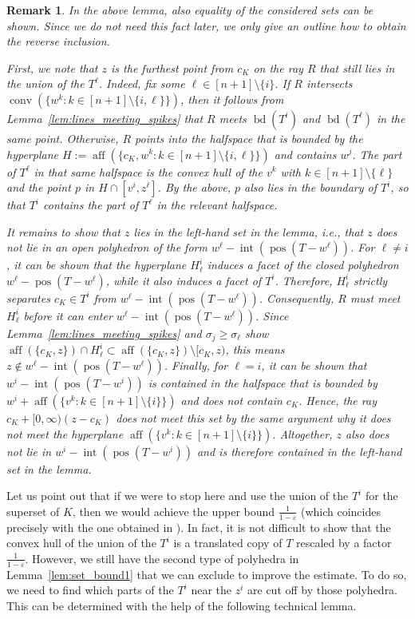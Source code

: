 \documentclass{amsart}
\newtheorem{remark}[theorem]{Remark}
\DeclareMathOperator{\conv}{conv}
\DeclareMathOperator{\pos}{pos}
\DeclareMathOperator{\aff}{aff}
\DeclareMathOperator{\inte}{int}
\DeclareMathOperator{\bd}{bd}
\begin{document}
\begin{remark}\label{rem:exact_Ti_description}
In the above lemma, also equality of the considered sets can be shown.
Since we do not need this fact later, we only give an outline how to obtain the reverse inclusion.

First, we note that $z$ is the furthest point from $c_K$ on the ray $R$ that still lies in the union of the $T^\ell$.
Indeed, fix some $\ell \in [n+1] \setminus \{i\}$.
If $R$ intersects $\conv(\{ w^k : k \in [n+1] \setminus \{i,\ell\} \})$, then it follows from Lemma~\ref{lem:lines_meeting_spikes} that $R$ meets $\bd(T^i)$ and $\bd(T^\ell)$ in the same point.
Otherwise, $R$ points into the halfspace that is bounded by the hyperplane $H := \aff(\{c_K, w^k : k \in [n+1] \setminus \{i,\ell\} \})$ and contains $w^j$.
The part of $T^\ell$ in that same halfspace is the convex hull of the $v^k$ with $k \in [n+1] \setminus \{\ell\}$ and the point $p$ in $H \cap [v^i,z^\ell]$.
By the above, $p$ also lies in the boundary of $T^i$, so that $T^i$ contains the part of $T^\ell$ in the relevant halfspace.

It remains to show that $z$ lies in the left-hand set in the lemma,
i.e., that $z$ does not lie in an open polyhedron of the form $w^\ell - \inte(\pos( T - w^\ell ))$.
For $\ell \neq i$,
it can be shown that the hyperplane $H^i_\ell$ induces a facet of the closed polyhedron $w^\ell - \pos( T - w^\ell )$,
while it also induces a facet of $T^i$.
Therefore, $H^i_\ell$ strictly separates $c_K \in T^i$ from $w^\ell - \inte(\pos( T - w^\ell ))$.
Consequently, $R$ must meet $H^i_\ell$ before it can enter $w^\ell - \inte(\pos( T - w^\ell ))$.
Since Lemma~\ref{lem:lines_meeting_spikes} and $\sigma_j \geq \sigma_\ell$ show
$\aff(\{c_K,z\}) \cap H^i_\ell \subset \aff(\{c_K,z\}) \setminus [c_K,z)$,
this means $z \notin w^\ell - \inte(\pos( T - w^\ell ))$.
Finally, for $\ell = i$, it can be shown that $w^i - \inte(\pos( T - w^i ))$ is contained
in the halfspace that is bounded by $w^i + \aff(\{ v^k : k \in [n+1] \setminus \{i\} \})$ and does not contain $c_K$.
Hence, the ray $c_K + [0,\infty) (z - c_K)$ does not meet this set by the same argument
why it does not meet the hyperplane $\aff(\{ v^k : k \in [n+1] \setminus \{i\} \})$.
Altogether, $z$ also does not lie in $w^i - \inte(\pos( T - w^i ))$ and is therefore contained in the left-hand set in the lemma.
\end{remark}



Let us point out that if we were to stop here and use the union of the $T^i$ for the superset of $K$,
then we would achieve the upper bound $\frac{1}{1-\varepsilon}$
(which coincides precisely with the one obtained in \cite{2026:BakaevYehudayoff}).
In fact, it is not difficult to show that the convex hull of the union of the $T^i$ is a translated copy of $T$ rescaled by a factor $\frac{1}{1-\varepsilon}$.
However, we still have the second type of polyhedra in Lemma~\ref{lem:set_bound1} that we can exclude to improve the estimate.
To do so, we need to find which parts of the $T^i$ near the $z^i$ are cut off by those polyhedra.
This can be determined with the help of the following technical lemma.
\end{document}
